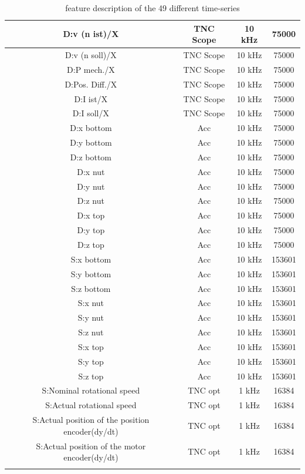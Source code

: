 \begin{center}
\begin{longtable}{||c c c c||}
 \hline
 D:v (n ist)/X & TNC Scope & 10 kHz & 75000 \\ 
 \hline
 D:v (n soll)/X & TNC Scope & 10 kHz & 75000 \\ 
 \hline
 D:P mech./X & TNC Scope & 10 kHz & 75000 \\ 
 \hline
 D:Pos. Diff./X & TNC Scope & 10 kHz & 75000 \\ 
  \hline
 D:I ist/X & TNC Scope & 10 kHz & 75000 \\ 
 \hline
 D:I soll/X & TNC Scope & 10 kHz & 75000 \\ 
 \hline
 D:x bottom & Acc & 10 kHz & 75000 \\ 
  \hline
 D:y bottom & Acc & 10 kHz & 75000 \\ 
 \hline
 D:z bottom & Acc & 10 kHz & 75000 \\ 
 \hline
 D:x nut & Acc & 10 kHz & 75000 \\ 
 \hline
 D:y nut & Acc & 10 kHz & 75000 \\ 
 \hline
 D:z nut & Acc & 10 kHz & 75000 \\ 
 \hline
 D:x top & Acc & 10 kHz & 75000 \\
  \hline
 D:y top & Acc & 10 kHz & 75000 \\ 
 \hline
 D:z top & Acc & 10 kHz & 75000 \\ 
 \hline
 S:x bottom & Acc & 10 kHz & 153601 \\ 
 \hline
 S:y bottom & Acc & 10 kHz & 153601 \\ 
 \hline
 S:z bottom & Acc & 10 kHz & 153601 \\ 
 \hline
 S:x nut & Acc & 10 kHz & 153601 \\ 
  \hline
 S:y nut & Acc & 10 kHz & 153601 \\ 
 \hline
 S:z nut & Acc & 10 kHz & 153601 \\ 
 \hline
 S:x top & Acc & 10 kHz & 153601 \\ 
 \hline
 S:y top & Acc & 10 kHz & 153601 \\ 
 \hline
 S:z top & Acc & 10 kHz & 153601 \\ 
 \hline
 S:Nominal rotational speed & TNC opt & 1 kHz & 16384 \\
  \hline
 S:Actual rotational speed & TNC opt & 1 kHz & 16384 \\ 
 \hline
 S:Actual position of the position encoder(dy/dt) & TNC opt & 1 kHz & 16384 \\ 
 \hline
 S:Actual position of the motor encoder(dy/dt)  & TNC opt & 1 kHz & 16384  \\ [1ex] 
 \hline
\caption {feature description of the 49 different time-series}
\label {tab:description_of_the_49_recorded_features}
\end{longtable}
\end{center}




